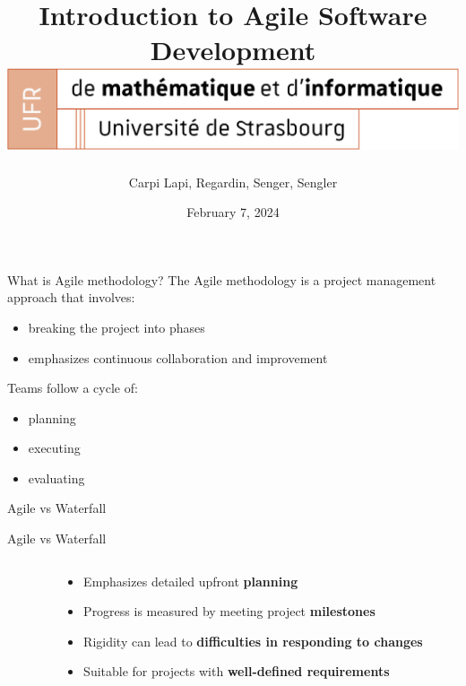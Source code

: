 \documentclass[10pt]{beamer}
\title[Introduction to Agile Software Development]{
  Introduction to Agile Software Development \\
  \vspace{1cm}
  \includegraphics[width=0.6\pdfpagewidth]{images/logo_Uni.png}
}
\author[SuperAgile]{Carpi Lapi, Regardin, Senger, Sengler}
\date[February 7, 2024]{February 7, 2024}
\begin{document}
\frame{\titlepage}

\begin{frame}{What is Agile methodology?}
The Agile methodology is a project management approach that involves:
\begin{itemize}
    \item breaking the project into phases
    \item emphasizes continuous collaboration and improvement \\
    \vspace{1cm}
\end{itemize}

Teams follow a cycle of: 
\begin{itemize}
    \item planning
    \item executing
    \item evaluating
\end{itemize}

\end{frame}


\begin{frame}{Agile vs Waterfall}
  \vspace{0.5cm}
\end{frame}

\begin{frame}{Agile vs Waterfall}
  \vspace{0.5cm}
  \begin{columns}[T]
    \begin{column}{0.5\textwidth}
    \end{column}

    \begin{column}{0.5\textwidth}
      \vspace{2cm}
      \begin{itemize}
        \item<2-> Emphasizes detailed upfront \textbf{planning}
        \item<3-> Progress is measured by meeting project \textbf{milestones}
        \item<4-> Rigidity can lead to \textbf{difficulties in responding to changes}
        \item<5-> Suitable for projects with \textbf{well-defined requirements}
      \end{itemize}
    \end{column}
  \end{columns}
\end{frame}
\end{document}
